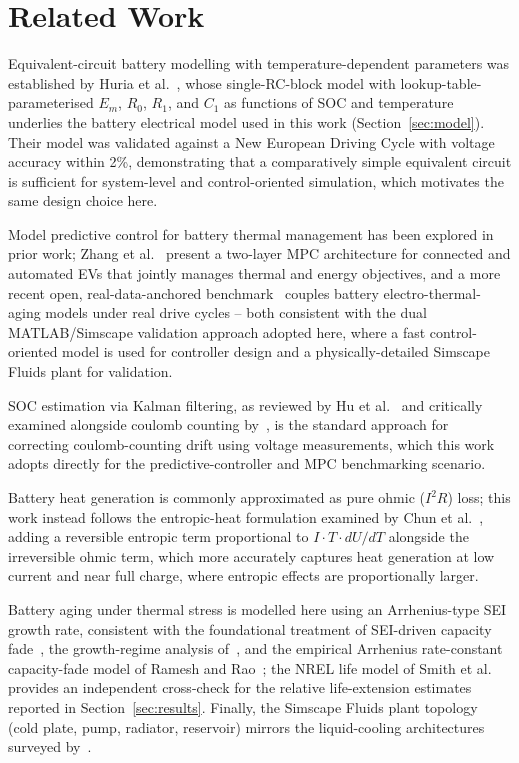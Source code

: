 \documentclass[10pt,conference]{IEEEtran}
\begin{document}
\section{Related Work}
\label{sec:related}

Equivalent-circuit battery modelling with temperature-dependent parameters was established by Huria et al.~\cite{huria2012}, whose single-RC-block model with lookup-table-parameterised $E_m$, $R_0$, $R_1$, and $C_1$ as functions of SOC and temperature underlies the battery electrical model used in this work (Section~\ref{sec:model}). Their model was validated against a New European Driving Cycle with voltage accuracy within 2\%, demonstrating that a comparatively simple equivalent circuit is sufficient for system-level and control-oriented simulation, which motivates the same design choice here.

Model predictive control for battery thermal management has been explored in prior work; Zhang et al.~\cite{zhang2018} present a two-layer MPC architecture for connected and automated EVs that jointly manages thermal and energy objectives, and a more recent open, real-data-anchored benchmark~\cite{physinformed2026} couples battery electro-thermal-aging models under real drive cycles -- both consistent with the dual MATLAB/Simscape validation approach adopted here, where a fast control-oriented model is used for controller design and a physically-detailed Simscape Fluids plant for validation.

SOC estimation via Kalman filtering, as reviewed by Hu et al.~\cite{hu2022} and critically examined alongside coulomb counting by~\cite{coulombkf2021}, is the standard approach for correcting coulomb-counting drift using voltage measurements, which this work adopts directly for the predictive-controller and MPC benchmarking scenario.

Battery heat generation is commonly approximated as pure ohmic ($I^2R$) loss; this work instead follows the entropic-heat formulation examined by Chun et al.~\cite{chun2024}, adding a reversible entropic term proportional to $I\cdot T\cdot dU/dT$ alongside the irreversible ohmic term, which more accurately captures heat generation at low current and near full charge, where entropic effects are proportionally larger.

Battery aging under thermal stress is modelled here using an Arrhenius-type SEI growth rate, consistent with the foundational treatment of SEI-driven capacity fade~\cite{sei2012}, the growth-regime analysis of~\cite{sei2020}, and the empirical Arrhenius rate-constant capacity-fade model of Ramesh and Rao~\cite{ramesh2015}; the NREL life model of Smith et al.~\cite{smith2022} provides an independent cross-check for the relative life-extension estimates reported in Section~\ref{sec:results}. Finally, the Simscape Fluids plant topology (cold plate, pump, radiator, reservoir) mirrors the liquid-cooling architectures surveyed by~\cite{coolingreview2024}.
\end{document}
